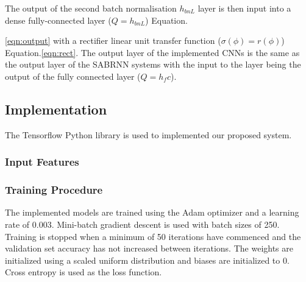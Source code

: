 \documentclass{article}
\begin{document}
{The output of the second batch normalisation $h_{bnL}$ layer is then input into a dense fully-connected layer ($Q=h_{bnL}$) Equation.{\ref{eqn:output} with a rectifier linear unit transfer function ($\sigma(\phi)=r(\phi)$) Equation.\ref{eqn:rect}. The output layer of the implemented CNNs is the same as the output layer of the SABRNN systems with the input to the layer being the output of the fully connected layer ($Q=h_fc$).


\subsection{Implementation}

The Tensorflow Python library is used to implemented our proposed system. 

\subsubsection{Input Features}

%

\subsubsection{Training Procedure}

The implemented models are trained using the Adam optimizer and a learning rate of 0.003.  Mini-batch gradient descent is used with batch sizes of 250. Training is stopped when a minimum of 50 iterations have commenced and the
validation set accuracy has not increased between iterations. The weights are initialized using a scaled uniform distribution \cite{DBLP:journals/corr/Sussillo14}
and biases are initialized to 0. Cross entropy is used as the loss function.

}}
\end{document}
